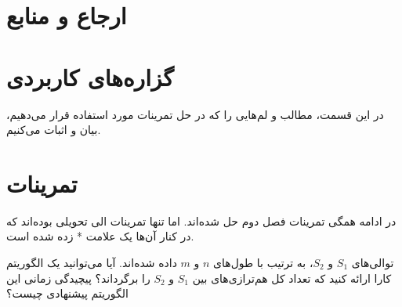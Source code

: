 \documentclass{scribe-cgenomics}
\begin{document}
\section{ارجاع و منابع}



















































\section{گزاره‌های کاربردی}
در این قسمت، مطالب و لم‌هایی را که در حل تمرینات مورد استفاده قرار می‌دهیم، بیان و اثبات می‌کنیم.


\section{تمرینات}
در ادامه همگی تمرینات فصل دوم حل شده‌اند. اما تنها تمرینات
الی
تحویلی بوده‌اند که در کنار آن‌ها یک علامت * زده شده است.

\bigbreak
\begin{prob}
توالی‌های
$S_1$
و
$S_2$،
به ترتیب با طول‌های
$n$
و
$m$
داده شده‌اند. آیا می‌توانید یک الگوریتم کارا ارائه کنید که تعداد کل هم‌ترازی‌های بین
$S_1$
و
$S_2$
را برگرداند؟ پیچیدگی زمانی این الگوریتم پیشنهادی چیست؟
\end{prob}
\end{document}

